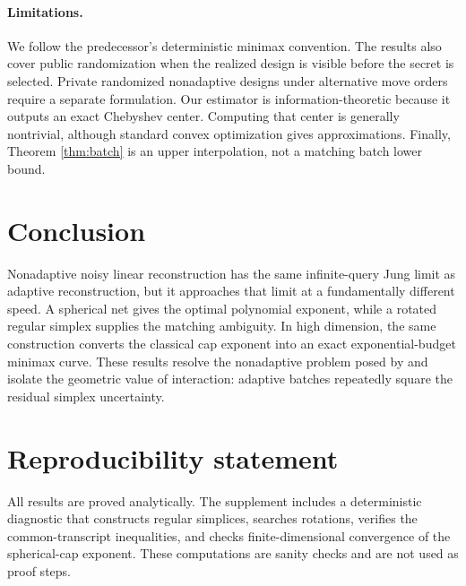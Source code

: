 \documentclass{article}
\theoremstyle{definition}
\begin{document}
\paragraph{Limitations.}
We follow the predecessor's deterministic minimax convention.  The results also cover public randomization when the realized design is visible before the secret is selected.  Private randomized nonadaptive designs under alternative move orders require a separate formulation.  Our estimator is information-theoretic because it outputs an exact Chebyshev center.  Computing that center is generally nontrivial, although standard convex optimization gives approximations.  Finally, Theorem \ref{thm:batch} is an upper interpolation, not a matching batch lower bound.

\section{Conclusion}

Nonadaptive noisy linear reconstruction has the same infinite-query Jung limit as adaptive reconstruction, but it approaches that limit at a fundamentally different speed.  A spherical net gives the optimal polynomial exponent, while a rotated regular simplex supplies the matching ambiguity.  In high dimension, the same construction converts the classical cap exponent into an exact exponential-budget minimax curve.  These results resolve the nonadaptive problem posed by \citet{filmus2026optimal} and isolate the geometric value of interaction: adaptive batches repeatedly square the residual simplex uncertainty.

\section*{Reproducibility statement}
All results are proved analytically.  The supplement includes a deterministic diagnostic that constructs regular simplices, searches rotations, verifies the common-transcript inequalities, and checks finite-dimensional convergence of the spherical-cap exponent.  These computations are sanity checks and are not used as proof steps.




\appendix

\end{document}
